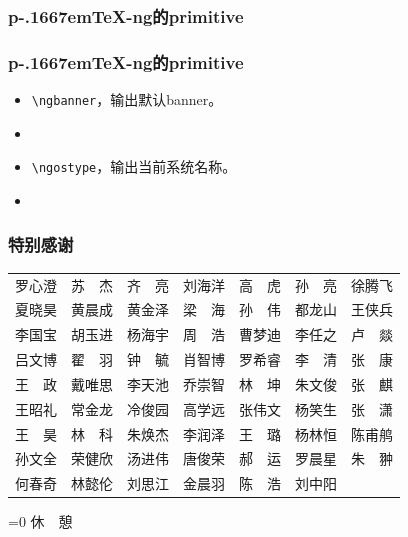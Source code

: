 \documentclass[dvipdfmx]{beamer}
\newcommand{\pTeX}{p\kern-.1667em\TeX}
\newcommand{\ptexng}{\pTeX-ng}
\begin{document}
%
\begin{frame}[fragile]
\frametitle{\bf \ptexng 的primitive}
\end{frame}
%
\begin{frame}[fragile]
\frametitle{\bf \ptexng 的primitive}
\begin{itemize}
\item \verb!\ngbanner!，输出默认banner。
\item \ngbanner
\item \verb!\ngostype!，输出当前系统名称。
\item \ngostype
\end{itemize}
\end{frame}
%
\begin{frame}[fragile]
\frametitle{\bf 特别感谢}
\begin{center}
\begin{tabular}{ccccccc}
罗心澄&苏　杰&齐　亮&刘海洋&高　虎&孙　亮&徐腾飞\\
夏晓昊&黄晨成&黄金泽&梁　海&孙　伟&都龙山&王侠兵\\
李国宝&胡玉进&杨海宇&周　浩&曹梦迪&李任之&卢　燚\\
吕文博&翟　羽&钟　毓&肖智博&罗希睿&李　清&张　康\\
王　政&戴唯思&李天池&乔崇智&林　坤&朱文俊&张　麒\\
王昭礼&常金龙&冷俊园&高学远&张伟文&杨笑生&张　潇\\
王　昊&林　科&朱焕杰&李润泽&王　璐&杨林恒&陈甫鸼\\
孙文全&荣健欣&汤进伟&唐俊荣&郝　运&罗晨星&朱　翀\\
何春奇&林懿伦&刘思江&金晨羽&陈　浩&刘中阳&\\
\end{tabular}
\end{center}
\end{frame}
%
\begin{frame}[fragile]
\begin{center}
\ifnum{}=0
\Huge 休　憩
\fi
\end{center}
\end{frame}
\end{document}
